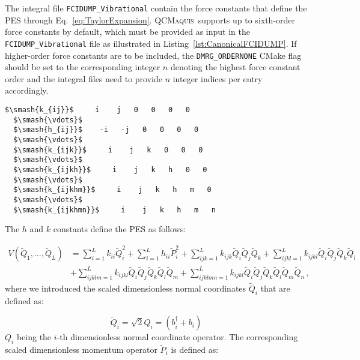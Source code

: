 \documentclass[bibliography=totoc,12pt,a4paper]{scrartcl}
\newcommand{\qcm}{\textsc{QCMaquis}}
\begin{document}
The integral file \texttt{FCIDUMP\_Vibrational} contain the force constants that define the PES through Eq.~\ref{eq:TaylorExpansion}.
\qcm\ supports up to sixth-order force constants by default, which must be provided as input in the \texttt{FCIDUMP\_Vibrational} file as illustrated in Listing~\ref{lst:CanonicalFCIDUMP}.
If higher-order force constants are to be included, the \texttt{DMRG\_ORDERNONE} CMake flag should be set to the corresponding integer $n$ denoting the highest force constant order and the integral files need to provide $n$ integer indices per entry accordingly.
\vspace{.5cm}
\begin{lstlisting}[language=qcmaquis,caption={Example of an vDMRG integral file for the potential
											  expressed in the canonical quantization format.},
				   label=lst:CanonicalFCIDUMP, mathescape=true, rulecolor=\color{black}]
  $\smash{k_{ij}}$     i    j   0   0   0   0
  $\smash{\vdots}$
  $\smash{h_{ij}}$    -i   -j   0   0   0   0
  $\smash{\vdots}$
  $\smash{k_{ijk}}$     i    j   k   0   0   0
  $\smash{\vdots}$
  $\smash{k_{ijkh}}$     i    j   k   h   0   0
  $\smash{\vdots}$
  $\smash{k_{ijkhm}}$     i    j   k   h   m   0
  $\smash{\vdots}$
  $\smash{k_{ijkhmn}}$     i    j   k   h   m   n
\end{lstlisting}
\vspace{.5cm}
The $h$ and $k$ constants define the PES as follows:

\begin{equation}
  \begin{aligned}
    V(\tilde{Q}_1, \ldots, \tilde{Q}_L) 
      &= \sum_{i=1}^L k_{ii} \tilde{Q}_i^2 + \sum_{i=1}^L h_{ii} \tilde{P}_i^2 
      + \sum_{ijk=1}^L k_{ijk} \tilde{Q}_i \tilde{Q}_j \tilde{Q}_k
      + \sum_{ijkl=1}^L k_{ijkl} \tilde{Q}_i \tilde{Q}_j \tilde{Q}_k \tilde{Q}_l \\
      &+ \sum_{ijklm=1}^L k_{ijkl} \tilde{Q}_i \tilde{Q}_j \tilde{Q}_k \tilde{Q}_l \tilde{Q}_m
      + \sum_{ijklmn=1}^L k_{ijkl} \tilde{Q}_i \tilde{Q}_j \tilde{Q}_k \tilde{Q}_l \tilde{Q}_m \tilde{Q}_n \, ,
  \end{aligned}
  \label{eq:PES_Representation}
\end{equation}
%
where we introduced the scaled dimensionless normal coordinates $\tilde{Q}_i$ that are defined as:

\begin{equation}
  \tilde{Q}_i = \sqrt{2} Q_i = \left( b_i^\dagger + b_i \right)
  \label{eq:ScaledNM}
\end{equation}
%
$Q_i$ being the $i$-th dimensionless normal coordinate operator.
The corresponding scaled dimensionless momentum operator $\tilde{P}_i$ is defined as:
\end{document}
